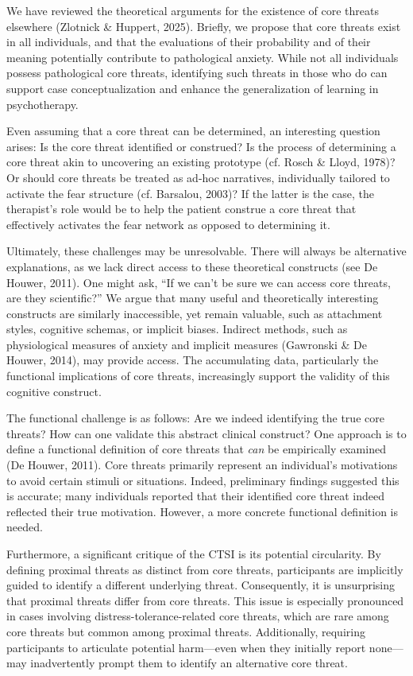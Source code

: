 \documentclass[
  man,floatsintext]{apa7}
\begin{document}
We have reviewed the theoretical arguments for the existence of core threats elsewhere (Zlotnick \& Huppert, 2025).
Briefly, we propose that core threats exist in all individuals, and that the evaluations of their probability and of their meaning potentially contribute to pathological anxiety.
While not all individuals possess pathological core threats, identifying such threats in those who do can support case conceptualization and enhance the generalization of learning in psychotherapy.

Even assuming that a core threat can be determined, an interesting question arises: Is the core threat identified or construed?
Is the process of determining a core threat akin to uncovering an existing prototype (cf. Rosch \& Lloyd, 1978)?
Or should core threats be treated as ad-hoc narratives, individually tailored to activate the fear structure (cf. Barsalou, 2003)?
If the latter is the case, the therapist's role would be to help the patient construe a core threat that effectively activates the fear network as opposed to determining it.

Ultimately, these challenges may be unresolvable.
There will always be alternative explanations, as we lack direct access to these theoretical constructs (see De Houwer, 2011).
One might ask, ``If we can't be sure we can access core threats, are they scientific?''
We argue that many useful and theoretically interesting constructs are similarly inaccessible, yet remain valuable, such as attachment styles, cognitive schemas, or implicit biases.
Indirect methods, such as physiological measures of anxiety and implicit measures (Gawronski \& De Houwer, 2014), may provide access.
The accumulating data, particularly the functional implications of core threats, increasingly support the validity of this cognitive construct.

The functional challenge is as follows: Are we indeed identifying the true core threats?
How can one validate this abstract clinical construct?
One approach is to define a functional definition of core threats that \emph{can} be empirically examined (De Houwer, 2011).
Core threats primarily represent an individual's motivations to avoid certain stimuli or situations.
Indeed, preliminary findings suggested this is accurate; many individuals reported that their identified core threat indeed reflected their true motivation.
However, a more concrete functional definition is needed.

Furthermore, a significant critique of the CTSI is its potential circularity.
By defining proximal threats as distinct from core threats, participants are implicitly guided to identify a different underlying threat.
Consequently, it is unsurprising that proximal threats differ from core threats.
This issue is especially pronounced in cases involving distress-tolerance-related core threats, which are rare among core threats but common among proximal threats.
Additionally, requiring participants to articulate potential harm---even when they initially report none---may inadvertently prompt them to identify an alternative core threat.
\end{document}
